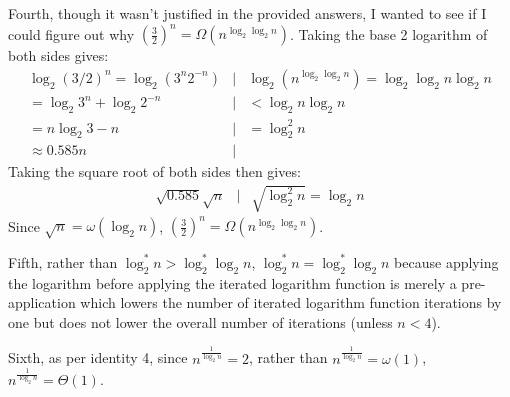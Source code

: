 \documentclass{article}
\begin{document}
Fourth, though it wasn't justified in the provided answers, I wanted to see if I could figure out why $\left ( \frac{3}{2} \right )^n = \Omega(n^{\log_2 \log_2 n})$.  Taking the base 2 logarithm of both sides gives:
\begin{eqnarray*}
	\log_2 (3/2)^n = \log_2 (3^n 2^{-n})	&|& \log_2 ( n^{\log_2 \log_2 n} ) = \log_2 \log_2 n \log_2 n \\
	= \log_2 3^n + \log_2 2^{-n} 		&|& < \log_2 n \log_2 n \\
	= n\log_2 3 - n				&|& = \log_2^2 n \\
	\approx 0.585n				&|&
\end{eqnarray*}
Taking the square root of both sides then gives:
\begin{eqnarray*}
	\sqrt{0.585} \sqrt{n} 			&|& \sqrt{\log_2^2 n} = \log_2 n
\end{eqnarray*}
Since $\sqrt{n} = \omega (\log_2 n)$, $\left ( \frac{3}{2} \right )^n = \Omega (n^{\log_2 \log_2 n})$.

Fifth, rather than $\log_2^* n > \log_2^* \log_2 n$, $\log_2^* n = \log_2^* \log_2 n$ because applying the logarithm before applying the iterated logarithm function is merely a pre-application which lowers the number of iterated logarithm function iterations by one but does not lower the overall number of iterations (unless $n < 4$).

Sixth, as per identity 4, since $n^{\frac{1}{\log_2 n}} = 2$, rather than $n^{\frac{1}{\log_2 n}} = \omega(1)$, $n^{\frac{1}{\log_2 n}} = \Theta (1)$.
\end{document}
